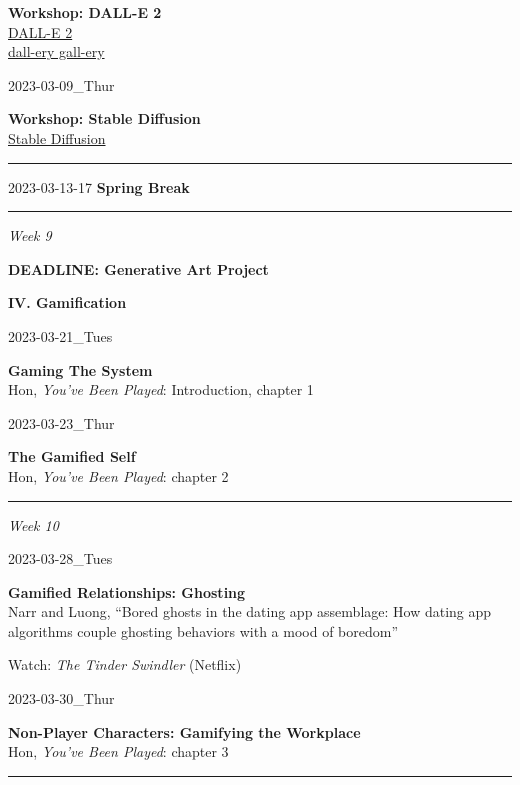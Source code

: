 \documentclass[
  letterpaper,
  DIV=11,
  numbers=noendperiod]{scrartcl}
\begin{document}
\textbf{Workshop: DALL-E 2}\\
\href{https://openai.com/dall-e-2/}{DALL-E 2}\\
\href{https://dallery.gallery/}{dall-ery gall-ery}

2023-03-09\_Thur

\textbf{Workshop: Stable Diffusion}\\
\href{https://stablediffusionweb.com/}{Stable Diffusion}

\begin{center}\rule{0.5\linewidth}{0.5pt}\end{center}

2023-03-13-17 \textbf{Spring Break}

\begin{center}\rule{0.5\linewidth}{0.5pt}\end{center}

\emph{Week 9}

\textbf{DEADLINE: Generative Art Project}

\textbf{IV. Gamification}

2023-03-21\_Tues

\textbf{Gaming The System}\\
Hon, \emph{You've Been Played}: Introduction, chapter 1

2023-03-23\_Thur

\textbf{The Gamified Self}\\
Hon, \emph{You've Been Played}: chapter 2

\begin{center}\rule{0.5\linewidth}{0.5pt}\end{center}

\emph{Week 10}

2023-03-28\_Tues

\textbf{Gamified Relationships: Ghosting}\\
Narr and Luong, ``Bored ghosts in the dating app assemblage: How dating
app algorithms couple ghosting behaviors with a mood of boredom''

Watch: \emph{The Tinder Swindler} (Netflix)

2023-03-30\_Thur

\textbf{Non-Player Characters: Gamifying the Workplace}\\
Hon, \emph{You've Been Played}: chapter 3

\begin{center}\rule{0.5\linewidth}{0.5pt}\end{center}
\end{document}
